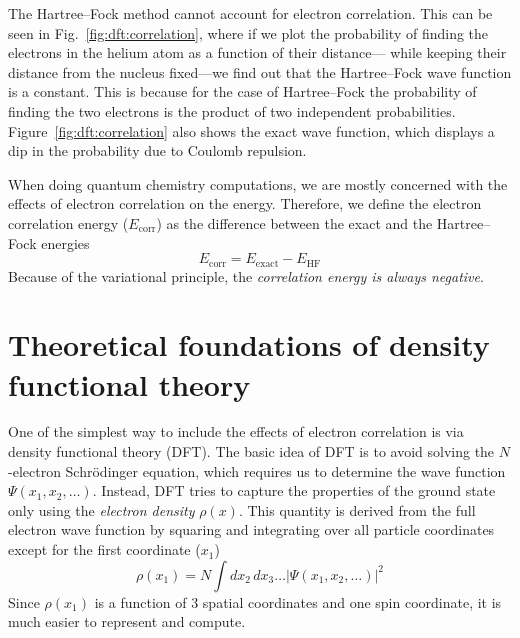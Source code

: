 \documentclass[../Main/notes.tex]{subfiles}
\begin{document}
The Hartree--Fock method cannot account for electron correlation.
This can be seen in Fig.~\ref{fig:dft:correlation}, where if we plot the probability of finding the electrons in the helium atom as a function of their distance--- while keeping their distance from the nucleus fixed---we find out that the Hartree--Fock wave function is a constant.
This is because for the case of Hartree--Fock the probability of finding the two electrons is the product of two independent probabilities.
Figure~\ref{fig:dft:correlation} also shows the exact wave function, which displays a dip in the probability due to Coulomb repulsion.

When doing quantum chemistry computations, we are mostly concerned with the effects of electron correlation on the energy. Therefore, we define the electron correlation energy ($E_\mathrm{corr}$) as the difference between the exact and the Hartree--Fock energies
\begin{equation}
E_\mathrm{corr} = E_\mathrm{exact} - E_\mathrm{HF}
\end{equation}
Because of the variational principle, the \emph{correlation energy is always negative}.

\section{Theoretical foundations of density functional theory}
One of the simplest way to include the effects of electron correlation is via density functional theory (DFT).
The basic idea of DFT is to avoid solving the $N$-electron Schr\"{o}dinger equation, which requires us to determine the wave function $\Psi(x_1,x_2, \ldots)$.
Instead, DFT tries to capture the properties of the ground state only using the \emph{electron density} $\rho(x)$.
This quantity is derived from the full electron wave function by squaring and integrating over all particle coordinates except for the first coordinate ($x_1$)
\begin{equation}
\rho(x_1) = N \int dx_2 \, dx_3 \ldots |\Psi(x_1,x_2, \ldots)|^2
\end{equation}
Since $\rho(x_1)$ is a function of 3 spatial coordinates and one spin coordinate, it is much easier to represent and compute.

\end{document}
